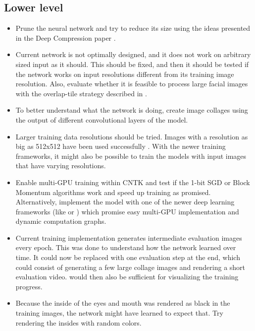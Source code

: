 \subsection{Lower level}

\begin{itemize}
    \item Prune the neural network and try to reduce its size using the ideas presented in the Deep Compression paper \cite{Han2015}.
    \item Current network is not optimally designed, and it does not work on arbitrary sized input as it should. This should be fixed, and then it should be tested if the network works on input resolutions different from its training image resolution. Also, evaluate whether it is feasible to process large facial images with the overlap-tile strategy described in \cite{Ronneberger2015}.
    \item To better understand what the network is doing, create image collages using the output of different convolutional layers of the model.
    \item Larger training data resolutions should be tried. Images with a resolution as big as 512x512 have been used successfully \cite{Sela2017}. With the newer training frameworks, it might also be possible to train the models with input images that have varying resolutions.
    \item Enable multi-\ac{GPU} training within \ac{CNTK} and test if the 1-bit \ac{SGD} \cite{1-bit-sgd} or Block Momentum \cite{block-momentum} algorithms work and speed up training as promised. Alternatively, implement the model with one of the newer deep learning frameworks (like \textcite{pytorch} or \textcite{chainer}) which promise easy multi-\ac{GPU} implementation and dynamic computation graphs.
    \item Current training implementation generates intermediate evaluation images every epoch. This was done to understand how the network learned over time. It could now be replaced with one evaluation step at the end, which could consist of generating a few large collage images and rendering a short evaluation video. \textcite{tensorboard} would then also be sufficient for visualizing the training progress.
    \item Because the inside of the eyes and mouth was rendered as black in the training images, the network might have learned to expect that. Try rendering the insides with random colors.
\end{itemize}

